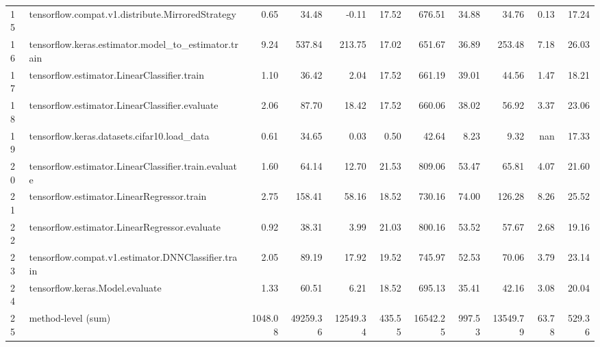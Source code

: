 \begin{tabular}{llrrrrrrrrr}
15 & tensorflow.compat.v1.distribute.MirroredStrategy & 0.65 & 34.48 & -0.11 & 17.52 & 676.51 & 34.88 & 34.76 & 0.13 & 17.24 \\
16 & tensorflow.keras.estimator.model_to_estimator.train & 9.24 & 537.84 & 213.75 & 17.02 & 651.67 & 36.89 & 253.48 & 7.18 & 26.03 \\
17 & tensorflow.estimator.LinearClassifier.train & 1.10 & 36.42 & 2.04 & 17.52 & 661.19 & 39.01 & 44.56 & 1.47 & 18.21 \\
18 & tensorflow.estimator.LinearClassifier.evaluate & 2.06 & 87.70 & 18.42 & 17.52 & 660.06 & 38.02 & 56.92 & 3.37 & 23.06 \\
19 & tensorflow.keras.datasets.cifar10.load_data & 0.61 & 34.65 & 0.03 & 0.50 & 42.64 & 8.23 & 9.32 & nan & 17.33 \\
20 & tensorflow.estimator.LinearClassifier.train.evaluate & 1.60 & 64.14 & 12.70 & 21.53 & 809.06 & 53.47 & 65.81 & 4.07 & 21.60 \\
21 & tensorflow.estimator.LinearRegressor.train & 2.75 & 158.41 & 58.16 & 18.52 & 730.16 & 74.00 & 126.28 & 8.26 & 25.52 \\
22 & tensorflow.estimator.LinearRegressor.evaluate & 0.92 & 38.31 & 3.99 & 21.03 & 800.16 & 53.52 & 57.67 & 2.68 & 19.16 \\
23 & tensorflow.compat.v1.estimator.DNNClassifier.train & 2.05 & 89.19 & 17.92 & 19.52 & 745.97 & 52.53 & 70.06 & 3.79 & 23.14 \\
24 & tensorflow.keras.Model.evaluate & 1.33 & 60.51 & 6.21 & 18.52 & 695.13 & 35.41 & 42.16 & 3.08 & 20.04 \\
25 & method-level (sum) & 1048.08 & 49259.36 & 12549.34 & 435.55 & 16542.25 & 997.53 & 13549.79 & 63.78 & 529.36 \\
\end{tabular}
